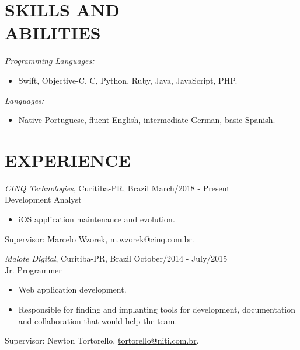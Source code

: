 \documentclass[margin]{res}
\begin{document}
\begin{resume}
		\section{SKILLS AND \\ABILITIES}
			{\sl Programming Languages:}
			\begin{itemize}
	 			\item[] Swift, Objective-C, C, Python, Ruby, Java, JavaScript, PHP.
	  		\end{itemize}
			{\sl Languages:}
			\begin{itemize}
				\item[] Native Portuguese, fluent English, intermediate German, basic Spanish.
			\end{itemize}

 		\section{EXPERIENCE}
 			{\sl CINQ Technologies}, Curitiba-PR, Brazil \hfill March/2018 - Present \\
 			Development Analyst
 			\begin{itemize}
				\itemsep -2pt
		    	\item iOS application maintenance and evolution.
			\end{itemize}
			Supervisor: Marcelo Wzorek, \href{mailto:m.wzorek@cinq.com.br}{m.wzorek@cinq.com.br}.
 		
			{\sl Malote Digital}, Curitiba-PR, Brazil \hfill October/2014 - July/2015 \\
			Jr. Programmer
			\begin{itemize}
				\itemsep -2pt
		    	\item Web application development.
				\item Responsible for finding and implanting tools for development, documentation and collaboration that would help the team.
			\end{itemize}
			Supervisor: Newton Tortorello, \href{mailto:tortorello@niti.com.br}{tortorello@niti.com.br}.
			

\end{resume}
\end{document}
